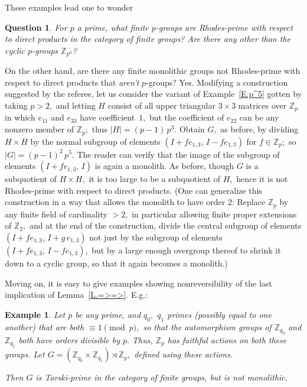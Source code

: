 \documentclass{amsart}
\newtheorem{question}[theorem]{Question}
\newtheorem{example}[theorem]{Example}
\numberwithin{equation}{section}
\numberwithin{theorem}{section}
\newcommand{\Z}{\mathbb{Z}}
\begin{document}
These examples lead one to wonder

\begin{question}\label{Q.p-gps}
For $p$ a prime, what finite $\!p\!$-groups {\em are} Rhodes-prime
with respect to direct products in the category of finite groups?
Are there any other than the cyclic $\!p\!$-groups $\Z_{p^n}$?
\end{question}

On the other hand, are there any finite monolithic groups not
Rhodes-prime with respect to direct products
that {\em aren't} $\!p\!$-groups?
Yes.
Modifying a construction suggested by the referee, let us consider
the variant of Example~\ref{E.p^5} gotten by taking $p>2,$
and letting $H$ consist of all upper triangular
$3\times 3$ matrices over $\Z_p$
in which $e_{11}$ and $e_{33}$ have coefficient~$1,$
but the coefficient of $e_{22}$ can be any nonzero member of $\Z_p;$
thus $|H|=(p{-}1)\,p^3.$
Obtain $G,$ as before, by dividing $H\times H$ by the normal
subgroup of elements $(I+fe_{1,3},\,I-fe_{1,3})$ for $f\in\Z_p;$
so $|G|=(p{-}1)^2\,p^5.$
The reader can verify that the image of the subgroup of
elements $(I+fe_{1,3},\,I)$ is again a monolith.
As before, though $G$ is a
subquotient of $H\times H,$ it is too large to be a subquotient of
$H,$ hence it is not Rhodes-prime with respect to direct products.
(One can generalize this construction in a way that allows
the monolith to have order $2$: Replace $\Z_p$ by any finite
field of cardinality $>2,$ in particular allowing finite
proper extensions of $\Z_2,$ and at the end of the construction,
divide the central subgroup of elements $(I+fe_{1,3},\,I+g\,e_{1,3})$
not just by the subgroup of elements $(I+fe_{1,3},\,I-fe_{1,3}),$ but by
a large enough overgroup thereof to shrink it down to a cyclic group,
so that it again becomes a monolith.)

Moving on, it is easy to give examples showing nonreversibility
of the last implication of Lemma~\ref{L.=>=>}.
E.g.:

\begin{example}\label{E.p,q1,q2}
Let $p$ be any prime, and $q_0,$ $q_1$ primes {\rm(}possibly
equal to one another{\rm)} that are both \mbox{$\equiv 1\pmod{p},$}
so that the automorphism groups of $\Z_{q_0}$ and $\Z_{q_1}$
both have orders divisible by $p.$
Thus, $\Z_p$ has faithful actions on both these groups.
Let $G=(\Z_{q_0}\times\Z_{q_1})\rtimes\Z_p,$ defined using
these actions.

Then $G$ is Tarski-prime in the category of finite groups, but
is not monolithic.
\end{example}
\end{document}
